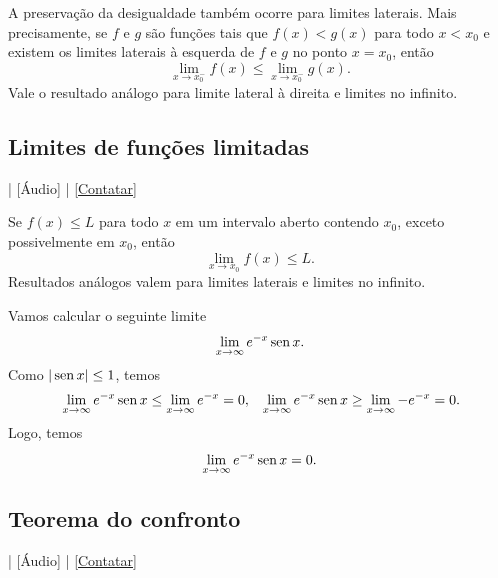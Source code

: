 \begin{obs}
  A preservação da desigualdade também ocorre para limites laterais. Mais precisamente, se $f$ e $g$ são funções tais que $f(x)<g(x)$ para todo $x < x_0$ e existem os limites laterais à esquerda de $f$ e $g$ no ponto $x=x_0$, então
  \begin{equation}
    \lim_{x\to x_0^-} f(x) \leq \lim_{x\to x_0^-} g(x).
  \end{equation}
  Vale o resultado análogo para limite lateral à direita e limites no infinito.
\end{obs}

\subsection{Limites de funções limitadas}

\begin{flushright}
  [Vídeo] | [Áudio] | \href{https://phkonzen.github.io/notas/contato.html}{[Contatar]}
\end{flushright}

Se $f(x) \leq L$ para todo $x$ em um intervalo aberto contendo $x_0$, exceto possivelmente em $x_0$, então
\begin{equation}
  \lim_{x\to x_0} f(x) \leq L.
\end{equation}
Resultados análogos valem para limites laterais e limites no infinito.

\begin{ex}
  Vamos calcular o seguinte limite
  \begin{equation}
    \lim_{x\to \infty} e^{-x}\operatorname{sen} x.
  \end{equation}
  Como $|\operatorname{sen} x| \leq 1$, temos
  \begin{align}
    & \lim_{x\to \infty} e^{-x}\operatorname{sen} x \leq \lim_{x\to \infty} e^{-x} = 0,
    & \lim_{x\to \infty} e^{-x}\operatorname{sen} x \geq \lim_{x\to \infty} -e^{-x} = 0.
  \end{align}
  Logo, temos
  \begin{equation}
    \lim_{x\to \infty} e^{-x}\operatorname{sen} x = 0.
  \end{equation}
\end{ex}


\subsection{Teorema do confronto}

\begin{flushright}
  [Vídeo] | [Áudio] | \href{https://phkonzen.github.io/notas/contato.html}{[Contatar]}
\end{flushright}

